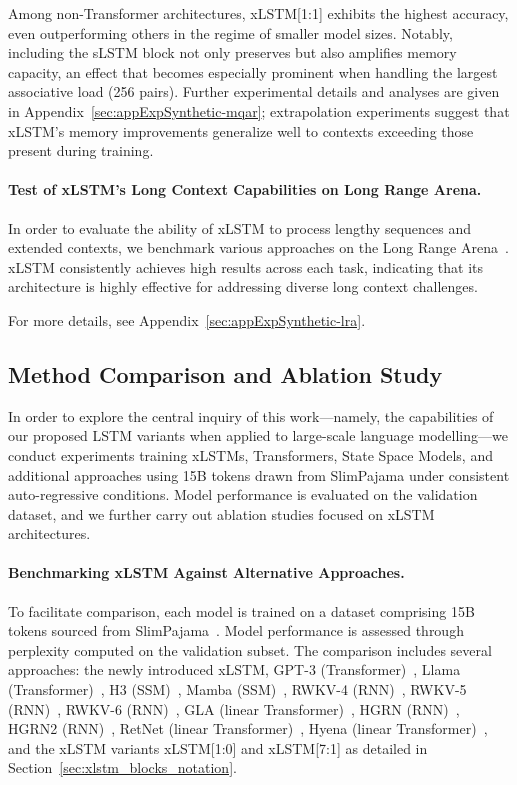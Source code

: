 Among non-Transformer architectures, xLSTM[1:1] exhibits the highest accuracy, even outperforming others in the regime of smaller model sizes. Notably, including the sLSTM block not only preserves but also amplifies memory capacity, an effect that becomes especially prominent when handling the largest associative load (256 pairs). Further experimental details and analyses are given in Appendix~\ref{sec:appExpSynthetic-mqar}; extrapolation experiments suggest that xLSTM's memory improvements generalize well to contexts exceeding those present during training.

\paragraph{Test of xLSTM's Long Context Capabilities on Long Range Arena.} In order to evaluate the ability of xLSTM to process lengthy sequences and extended contexts, we benchmark various approaches on the Long Range Arena~\citep{Tay:21}. xLSTM consistently achieves high results across each task, indicating that its architecture is highly effective for addressing diverse long context challenges.

For more details, see Appendix~\ref{sec:appExpSynthetic-lra}.

\subsection{Method Comparison and Ablation Study}
\label{sec:ExpComparison}

In order to explore the central inquiry of this work—namely, the capabilities of our proposed LSTM variants when applied to large-scale language modelling—we conduct experiments training xLSTMs, Transformers, State Space Models, and additional approaches using 15B tokens drawn from SlimPajama under consistent auto-regressive conditions. Model performance is evaluated on the validation dataset, and we further carry out ablation studies focused on xLSTM architectures.

\paragraph{Benchmarking xLSTM Against Alternative Approaches.} To facilitate comparison, each model is trained on a dataset comprising 15B tokens sourced from SlimPajama~\citep{Soboleva:23}. Model performance is assessed through perplexity computed on the validation subset. The comparison includes several approaches: the newly introduced xLSTM, GPT-3 (Transformer)~\citep{Brown:20short}, Llama (Transformer)~\citep{Touvron:23arxiv}, H3 (SSM)~\citep{Fu:23}, Mamba (SSM)~\citep{Gu:24arxiv}, RWKV-4 (RNN)~\citep{Peng:23arxivshort}, RWKV-5 (RNN)~\citep{Peng:24arxivshort}, RWKV-6 (RNN)~\citep{Peng:24arxivshort}, GLA (linear Transformer)~\citep{Yang:23arxiv}, HGRN (RNN)~\citep{Qin:23}, HGRN2 (RNN)~\citep{Qin:24arxiv}, RetNet (linear Transformer)~\citep{Sun:23arxiv}, Hyena (linear Transformer)~\citep{Poli:23}, and the xLSTM variants xLSTM[1:0] and xLSTM[7:1] as detailed in Section~\ref{sec:xlstm_blocks_notation}. 

